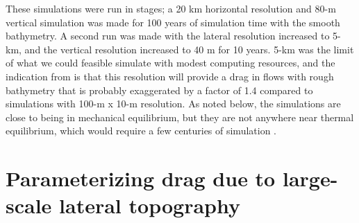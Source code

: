 \documentclass[twocol]{ametsocV5}
\newcommand{\tempS}[1]{}
\newcommand{\twowidth}[0]{4in}
\begin{document}
These simulations were run in stages; a 20 km horizontal resolution and 80-m vertical simulation was made for 100 years of simulation time with the smooth bathymetry.  A second run was made with the lateral resolution increased to 5-km, and the vertical resolution increased to 40 m for 10 years. 5-km was the limit of what we could feasible simulate with modest computing resources, and the indication from \citet{klymak18} is that this resolution will provide a drag in flows with rough bathymetry that is probably exaggerated by a factor of 1.4 compared to simulations with  100-m x 10-m resolution.     
As noted below, the simulations are close to being in mechanical equilibrium, but they are not anywhere near thermal equilibrium, which would require a few centuries of simulation \citep[i.e.][run similar simulations for 620 years]{Munday_2015}.   

\section{Parameterizing drag due to large-scale lateral topography}
\label{sec:ResultsSingleFlow}


\end{document}
